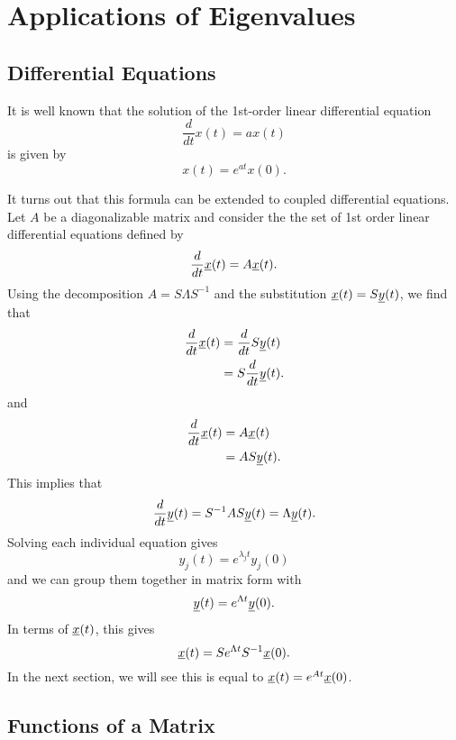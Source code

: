 \section{Applications of Eigenvalues}

\subsection{Differential Equations}
\label{sec:Differential_Equations}

It is well known that the solution of the 1st-order linear differential equation
\[ \frac{d}{dt} x(t) = a x(t) \]
is given by
\[ x(t) = e^{at} x(0). \]

It turns out that this formula can be extended to coupled differential equations.
Let $A$ be a diagonalizable matrix and consider the the set of 1st order linear differential equations defined by
\[ \frac{d}{dt} \underline{x}(t) = A \underline{x}(t). \]
Using the decomposition $A = S \Lambda S^{-1}$ and the substitution $\underline{x}(t) = S \underline{y}(t)$, we find that
\begin{align*}
\frac{d}{dt} \underline{x}(t)
& = \frac{d}{dt} S \underline{y}(t) \\
& = S \frac{d}{dt} \underline{y}(t).
\end{align*}
and
\begin{align*}
\frac{d}{dt} \underline{x}(t)
& = A \underline{x}(t) \\
& = A S \underline{y}(t).
\end{align*}
This implies that
\[ \frac{d}{dt} \underline{y}(t) = S^{-1} A S \underline{y}(t) = \Lambda \underline{y}(t). \]
Solving each individual equation gives
\[ y_j (t) = e^{\lambda_j t} y_j (0) \]
and we can group them together in matrix form with
\[ \underline{y}(t) = e^{\Lambda t} \underline{y}(0). \]
In terms of $\underline{x}(t)$, this gives
\[ \underline{x}(t) = S e^{\Lambda t} S^{-1} \underline{x}(0). \]
In the next section, we will see this is equal to $ \underline{x}(t) = e^{A t} \underline{x}(0)$.

\subsection{Functions of a Matrix}

